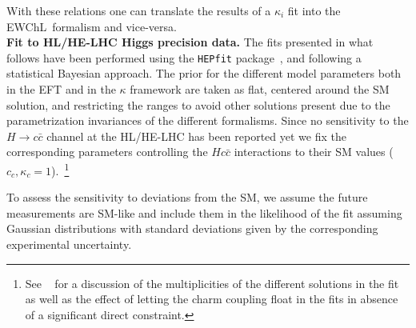 %
With these relations one can translate the results of a $\kappa_i$ fit into the EWChL~formalism and vice-versa. \\

\noindent
{\bf Fit to HL/HE-LHC Higgs precision data.}
The fits presented in what follows have been performed using the {\tt HEPfit} package~\cite{hepfit,hepfitsite}, and following a statistical Bayesian approach.  
 The prior for the different model parameters both in the EFT and in the $\kappa$ framework are taken as flat, centered around the SM solution, and restricting the ranges to avoid other solutions present due to the parametrization invariances of the different formalisms.
Since no sensitivity to the $H\to c\bar{c}$ channel at the HL/HE-LHC has been reported yet we fix the corresponding parameters controlling the $Hc\bar c$ interactions to their SM values ($c_c,\kappa_c=1$).~\footnote{See ~\cite{deBlas:2018tjm} for a discussion of the multiplicities of the different solutions in the fit as well as the effect of letting the charm coupling float in the fits in absence of a significant direct constraint.}

To assess the sensitivity to deviations from the SM, we assume the future measurements are SM-like and include them in the likelihood of the fit assuming Gaussian distributions with standard deviations given by the corresponding experimental uncertainty. 

